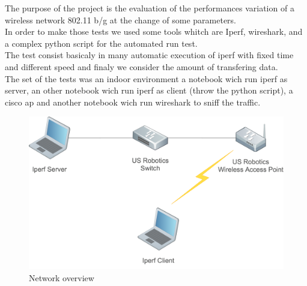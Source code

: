 
The purpose of the project 
is the evaluation of the performances variation of a wireless network 802.11 b/g at the change of some parameters.
\\\newline
In order to make those tests we used some tools whitch are Iperf, wireshark, and a complex python script for the automated run test.
\\\newline
The test consist basicaly in many automatic execution of iperf with fixed time and different speed and finaly we consider the amount of transfering data.
\\\newline
The set of the tests was an indoor environment a notebook wich run iperf as server, an other notebook wich run iperf as client (throw the python script), a cisco ap and another notebook wich run wireshark to sniff the traffic.

\vspace{1cm}

\begin{figure}[h!]
	\includegraphics[angle=0, keepaspectratio=true, width=15cm]{../images/network_overview}
	\caption{Network overview}
\end{figure}
